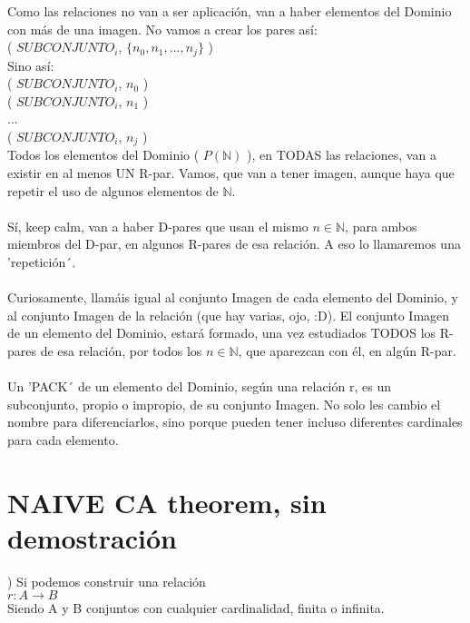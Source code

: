 	\noindent
	Como las relaciones no van a ser aplicación, van a haber elementos del Dominio con más de una imagen. No vamos a crear los pares así:\\
	( $SUBCONJUNTO_{i}$, $\{n_{0}, n_{1}, ..., n_{j} \}$ )\\
	Sino así:\\
	( $SUBCONJUNTO_{i}$, $n_{0}$ )\\
	( $SUBCONJUNTO_{i}$, $n_{1}$ )\\
	...\\
	( $SUBCONJUNTO_{i}$, $n_{j}$ )\\
	Todos los elementos del Dominio ( $P(\mathbb{N})$ ), en TODAS las relaciones, van a existir en al menos UN R-par. Vamos, que van a tener imagen, aunque haya que repetir el uso de algunos elementos de $\mathbb{N}$.
	\\\\
	
	\noindent
	Sí, keep calm, van a haber D-pares que usan el mismo $n \in \mathbb{N}$, para ambos miembros del D-par, en algunos R-pares de esa relación. A eso lo llamaremos una 'repetición´.
	\\\\
	
	\noindent
	Curiosamente, llamáis igual al conjunto Imagen de cada elemento del Dominio, y al conjunto Imagen de la relación (que hay varias, ojo, :D). El conjunto Imagen de un elemento del Dominio, estará formado, una vez estudiados TODOS los R-pares de esa relación, por todos los $n \in \mathbb{N}$, que aparezcan con él, en algún R-par.
	\\\\
	
	\noindent
	Un 'PACK´ de un elemento del Dominio, según una relación r, es un subconjunto, propio o impropio, de su conjunto Imagen. No solo les cambio el nombre para diferenciarlos, sino porque pueden tener incluso diferentes cardinales para cada elemento.
	
	
	\section{NAIVE CA theorem, sin demostración}
	
	) Si podemos construir una relación\\
	$r: A \rightarrow B$\\
	Siendo A y B conjuntos con cualquier cardinalidad, finita o infinita.
	\\\\
	
